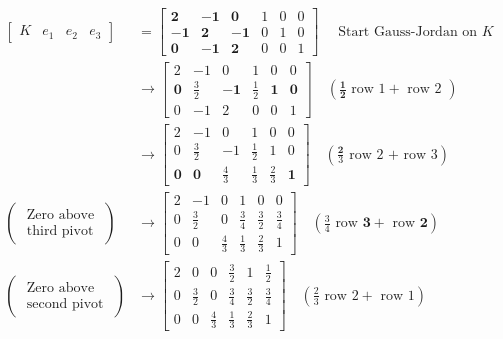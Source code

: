 \begin{example}
    $$ \begin{aligned}\left[\begin{array}{llll}K & e_{1} & e_{2} & e_{3}\end{array}\right] & =\left[\begin{array}{rrrrrr}\mathbf{2} & -\mathbf{1} & \mathbf{0} & 1 & 0 & 0 \\ -\mathbf{1} & \mathbf{2} & -\mathbf{1} & 0 & 1 & 0 \\ \mathbf{0} & -\mathbf{1} & \mathbf{2} & 0 & 0 & 1\end{array}\right] \quad \text { Start Gauss-Jordan on } K                                                  \\ & \rightarrow\left[\begin{array}{rrrrrr}2 & -1 & 0 & 1 & 0 & 0 \\ \mathbf{0} & \frac{3}{2} & -\mathbf{1} & \frac{1}{2} & \mathbf{1} & \mathbf{0} \\ 0 & -1 & 2 & 0 & 0 & 1\end{array}\right] \quad\left(\frac{\mathbf{1}}{\mathbf{2}} \text { row } 1+\text { row 2 }\right) \\ & \rightarrow\left[\begin{array}{rrrrrr}2 & -1 & 0 & 1 & 0 & 0 \\ 0 & \frac{3}{2} & -1 & \frac{1}{2} & 1 & 0 \\ \mathbf{0} & \mathbf{0} & \frac{4}{3} & \frac{1}{3} & \frac{2}{3} & \mathbf{1}\end{array}\right] \quad \left(\frac{\mathbf{2}}{3} \text { row 2 + row 3}\right)\\
               \left(\begin{array}{c}\text { Zero above } \\ \text { third pivot }\end{array}\right) & \rightarrow\left[\begin{array}{rrrrrr}2 & -1 & 0 & 1 & 0 & 0 \\ 0 & \frac{3}{2} & 0 & \frac{3}{4} & \frac{3}{2} & \frac{3}{4} \\ 0 & 0 & \frac{4}{3} & \frac{1}{3} & \frac{2}{3} & 1\end{array}\right] \quad\left(\frac{3}{4} \text{ row } \mathbf{3}+ \text{ row } \mathbf{2}\right) \\
               \left(\begin{array}{l}\text { Zero above } \\ \text { second pivot }\end{array}\right) & \rightarrow\left[\begin{array}{cccccc}2 & 0 & 0 & \frac{3}{2} & 1 & \frac{1}{2} \\ 0 & \frac{3}{2} & 0 & \frac{3}{4} & \frac{3}{2} & \frac{3}{4} \\ 0 & 0 & \frac{4}{3} & \frac{1}{3} & \frac{2}{3} & 1\end{array}\right] \quad\left(\frac{2}{3} \text{ row } 2+ \text{ row }1 \right)
        \end{aligned} $$



\end{example}
